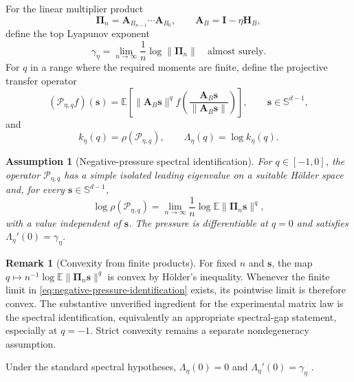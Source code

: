\documentclass[11pt]{article}
\newtheorem{assumption}{Assumption}
\theoremstyle{definition}
\newtheorem{remark}{Remark}
\newcommand{\E}{\mathbb E}
\newcommand{\Sph}{\mathbb S}
\newcommand{\Id}{\mathbf I}
\newcommand{\svec}{\mathbf s}
\newcommand{\Avec}{\mathbf A}
\newcommand{\Hvec}{\mathbf H}
\newcommand{\PiProd}{\boldsymbol\Pi}
\begin{document}
For the linear multiplier product
\begin{equation}
  \PiProd_n=\Avec_{B_{n-1}}\cdots\Avec_{B_0},
  \qquad \Avec_B=\Id-\eta\Hvec_B,
  \label{eq:product}
\end{equation}
define the top Lyapunov exponent
\begin{equation}
  \gamma_\eta
  =\lim_{n\to\infty}\frac1n\log\|\PiProd_n\|
  \quad\text{almost surely}.
  \label{eq:lyapunov}
\end{equation}
For $q$ in a range where the required moments are finite, define the
projective transfer operator
\begin{equation}
  (\mathcal P_{\eta,q}f)(\svec)
  =\E\left[
    \|\Avec_B\svec\|^q
    f\left(\frac{\Avec_B\svec}{\|\Avec_B\svec\|}\right)
  \right],
  \qquad \svec\in\Sph^{d-1},
  \label{eq:transfer}
\end{equation}
and
\begin{equation}
  k_\eta(q)=\rho(\mathcal P_{\eta,q}),
  \qquad
  \Lambda_\eta(q)=\log k_\eta(q).
  \label{eq:pressure}
\end{equation}

\begin{assumption}[Negative-pressure spectral identification]
\label{ass:negative-pressure-identification}
For $q\in[-1,0]$, the operator $\mathcal P_{\eta,q}$ has a simple isolated
leading eigenvalue on a suitable H\"older space and, for every
$\svec\in\Sph^{d-1}$,
\begin{equation}
 \log\rho(\mathcal P_{\eta,q})
 =\lim_{n\to\infty}\frac1n
   \log\E\|\PiProd_n\svec\|^q,
 \label{eq:negative-pressure-identification}
\end{equation}
with a value independent of $\svec$.  The pressure is differentiable at
$q=0$ and satisfies $\Lambda_\eta'(0)=\gamma_\eta$.
\end{assumption}

\begin{remark}[Convexity from finite products]
For fixed $n$ and $\svec$, the map
$q\mapsto n^{-1}\log\E\|\PiProd_n\svec\|^q$ is convex by H\"older's
inequality.  Whenever the finite limit in
\eqref{eq:negative-pressure-identification} exists, its pointwise limit is
therefore convex.  The substantive unverified ingredient for the experimental
matrix law is the spectral identification, equivalently an appropriate
spectral-gap statement, especially at $q=-1$.  Strict convexity remains a
separate nondegeneracy assumption.
\end{remark}

Under the standard spectral hypotheses,
$\Lambda_\eta(0)=0$ and
$\Lambda_\eta'(0)=\gamma_\eta$
\cite{GuivarchLePage2012,WangSteinsaltz2020}.
\end{document}
